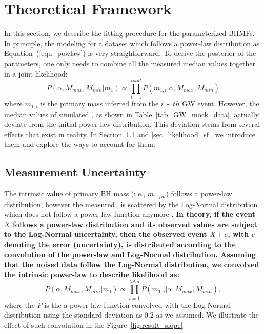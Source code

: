 \documentclass[twocolumn]{aastex62}
\begin{document}
\section{Theoretical Framework}  \label{sec_theory}
In this section, we describe the fitting procedure for the parameterized BHMFs. 
In principle, the modeling for a dataset which follows a power-law distribution as Equation~(\ref{equ_powlaw}) is very straightforward. To derive the posterior of the parameters, one only needs to combine all the measured median values together in a joint likelihood:
 \begin{equation} \label{equ_lik_powlaw}
 P(\alpha, M_{max}, M_{min}|m_{1}) \propto  \prod_{i=1}^{total} P(m_{1,i}|\alpha, M_{max}, M_{min})
 \end{equation}
 where $m_{1,i}$ is the primary mass inferred from the $i$~-~$th$ GW event.
However, the median values of simulated \mone, as shown in Table~\ref{tab_GW_mock_data}, actually deviate from the initial power-law distribution. This deviation stems from several effects that exist in reality. In Section~\ref{sec_likelihood_noise} and \ref{sec_likelihood_sf}, we introduce them and explore the ways to account for them.

\subsection{Measurement Uncertainty}\label{sec_likelihood_noise}
The intrinsic value of primary BH mass (i.e., $m_{1,fid}$) follows a power-law distribution, however the measured  \mone\ is scattered by the Log-Normal distribution which does not follow a power-law function anymore \citep{Koen2009}. \textbf{In theory, if the event $X$ follows a power-law distribution and its observed values are subject to the  Log-Normal uncertainty, then the observed event $X + e$,   with $e$ denoting the error (uncertainty), is distributed according to the convolution of the power-law and Log-Normal distribution. Assuming that the noised data follow the Log-Normal distribution, we convolved the intrinsic power-law to describe likelihood as:}
 \begin{equation} \label{equ_lik_conv}
 P(\alpha, M_{max}, M_{min}|m_{1}) \propto  \prod_{i=1}^{total} \hat{P}(m_{1,i}|\alpha, M_{max}, M_{min}),
 \end{equation}
where the $\hat{P}$ is the a power-law function convolved with the Log-Normal distribution using the standard deviation as 0.2 as we assumed. We illustrate the effect of such convolution in the Figure~\ref{fig:result_slope}.
\end{document}
